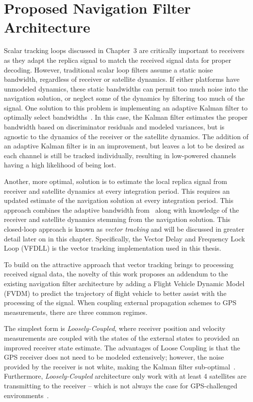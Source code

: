 \chapter{Proposed Navigation Filter Architecture}
Scalar tracking loops discussed in Chapter~3 are critically important to receivers as they adapt the replica signal to match the received signal data for proper decoding. However, traditional scalar loop filters assume a static noise bandwidth, regardless of receiver or satellite dynamics. If either platforms have unmodeled dynamics, these static bandwidths can permit too much noise into the navigation solution, or neglect some of the dynamics by filtering too much of the signal. One solution to this problem is implementing an adaptive Kalman filter to optimally select bandwidths~\cite{huangIntegratedAdaptiveKalman2019}. In this case, the Kalman filter estimates the proper bandwidth based on discriminator residuals and modeled variances, but is agnostic to the dynamics of the receiver or the satellite dynamics. The addition of an adaptive Kalman filter is in an improvement, but leaves a lot to be desired as each channel is still be tracked individually, resulting in low-powered channels having a high likelihood of being lost.

Another, more optimal, solution is to estimate the local replica signal from receiver and satellite dynamics at every integration period. This requires an updated estimate of the navigation solution at every integration period. This approach combines the adaptive bandwidth from~\cite{huangIntegratedAdaptiveKalman2019} along with knowledge of the receiver and satellite dynamics stemming from the navigation solution. This closed-loop approach is known as \textit{vector tracking} and will be discussed in greater detail later on in this chapter. Specifically, the Vector Delay and Frequency Lock Loop (VFDLL) is the vector tracking implementation used in this thesis.

To build on the attractive approach that vector tracking brings to processing received signal data, the novelty of this work proposes an addendum to the existing navigation filter architecture by adding a Flight Vehicle Dynamic Model (FVDM) to predict the trajectory of flight vehicle to better assist with the processing of the signal. When coupling external propagation schemes to GPS measurements, there are three common regimes. 

The simplest form is \textit{Loosely-Coupled}, where receiver position and velocity measurements are coupled with the states of the external states to provided an improved receiver state estimate. The advantages of Loose Coupling is that the GPS receiver does not need to be modeled extensively; however, the noise provided by the receiver is not white, making the Kalman filter sub-optimal~\cite{lashleyPerformanceAnalysisVector2009}. Furthermore, \textit{Loosely-Coupled} architecture only work with at least 4 satellites are transmitting to the receiver {--} which is not always the case for GPS-challenged environments~\cite{grovesPrinciplesGNSSInertial2012}.


